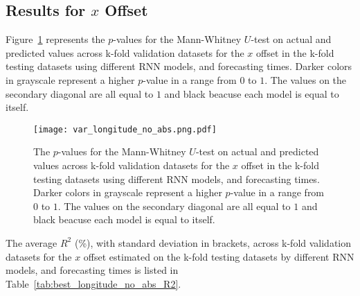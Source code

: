 \subsection{Results for $x$ Offset}

Figure~\ref{fig:var_longitude_no_abs.png} represents the $p$-values for the Mann-Whitney $U$-test on actual and predicted values across k-fold validation datasets for the $x$ offset in the k-fold testing datasets using different RNN models, and forecasting times. Darker colors in grayscale represent a higher $p$-value in a range from $0$ to $1$. The values on the secondary diagonal are all equal to $1$ and black beacuse each model is equal to itself.

\begin{figure}[!ht]
	\centering
	\texttt{[image: var\_longitude\_no\_abs.png.pdf]}
	\caption{The $p$-values for the Mann-Whitney $U$-test on actual and predicted values across k-fold validation datasets for the $x$ offset in the k-fold testing datasets using different RNN models, and forecasting times. Darker colors in grayscale represent a higher $p$-value in a range from $0$ to $1$. The values on the secondary diagonal are all equal to $1$ and black beacuse each model is equal to itself.}
	\label{fig:var_longitude_no_abs.png}
\end{figure}

The average $R^{2}$ (\%), with standard deviation in brackets, across k-fold validation datasets for the $x$ offset estimated on the k-fold testing datasets by different RNN models, and forecasting times is listed in Table~\ref{tab:best_longitude_no_abs_R2}.

